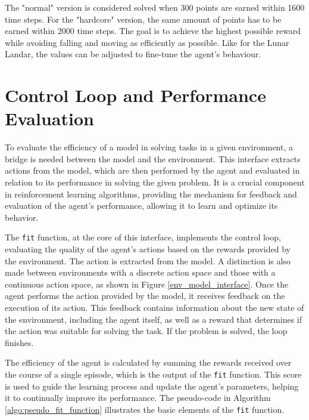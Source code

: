 The "normal" version is considered solved when 300 points are earned within 1600 time steps. For the "hardcore" version, the same amount of points has to be earned within 2000 time steps. The goal is to achieve the highest possible reward while avoiding falling and moving as efficiently as possible. Like for the Lunar Landar, the values can be adjusted to fine-tune the agent's behaviour.

\section{Control Loop and Performance Evaluation}

To evaluate the efficiency of a model in solving tasks in a given environment, a bridge is needed between the model and the environment. This interface extracts actions from the model, which are then performed by the agent and evaluated in relation to its performance in solving the given problem. It is a crucial component in reinforcement learning algorithms, providing the mechanism for feedback and evaluation of the agent's performance, allowing it to learn and optimize its behavior.

The \texttt{fit} function, at the core of this interface, implements the control loop, evaluating the quality of the agent's actions based on the rewards provided by the environment. The action is extracted from the model. A distinction is also made between environments with a discrete action space and those with a continuous action space, as shown in Figure \ref{env_model_interface}. Once the agent performs the action provided by the model, it receives feedback on the execution of its action. This feedback contains information about the new state of the environment, including the agent itself, as well as a reward that determines if the action was suitable for solving the task. If the problem is solved, the loop finishes.

The efficiency of the agent is calculated by summing the rewards received over the course of a single episode, which is the output of the \texttt{fit} function. This score is used to guide the learning process and update the agent's parameters, helping it to continually improve its performance. The pseudo-code in Algorithm \ref{algo:pseudo_fit_function} illustrates the basic elements of the \texttt{fit} function.





